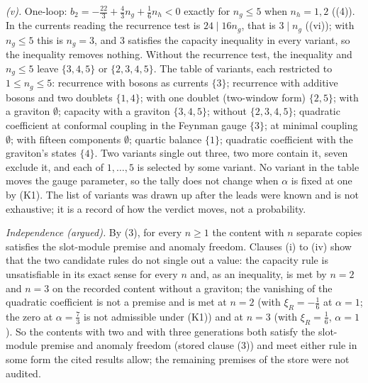 \emph{(v).} One-loop: $b_{2} = -\tfrac{22}{3} + \tfrac43 n_{g} + \tfrac16 n_{h} < 0$ exactly for $n_{g} \le 5$ when $n_{h} = 1, 2$ ((4)). In the currents reading the recurrence test is $24 \mid 16n_{g}$, that is $3 \mid n_{g}$ ((vi)); with $n_{g} \le 5$ this is $n_{g} = 3$, and $3$ satisfies the capacity inequality in every variant, so the inequality removes nothing. Without the recurrence test, the inequality and $n_{g} \le 5$ leave $\{3, 4, 5\}$ or $\{2, 3, 4, 5\}$. The table of variants, each restricted to $1 \le n_{g} \le 5$: recurrence with bosons as currents $\{3\}$; recurrence with additive bosons and two doublets $\{1, 4\}$; with one doublet (two-window form) $\{2, 5\}$; with a graviton $\emptyset$; capacity with a graviton $\{3, 4, 5\}$; without $\{2, 3, 4, 5\}$; quadratic coefficient at conformal coupling in the Feynman gauge $\{3\}$; at minimal coupling $\emptyset$; with fifteen components $\emptyset$; quartic balance $\{1\}$; quadratic coefficient with the graviton's states $\{4\}$. Two variants single out three, two more contain it, seven exclude it, and each of $1, \dots, 5$ is selected by some variant. No variant in the table moves the gauge parameter, so the tally does not change when $\alpha$ is fixed at one by (K1). The list of variants was drawn up after the leads were known and is not exhaustive; it is a record of how the verdict moves, not a probability.

\emph{Independence (argued).} By (3), for every $n \ge 1$ the content with $n$ separate copies satisfies the slot-module premise and anomaly freedom. Clauses (i) to (iv) show that the two candidate rules do not single out a value: the capacity rule is unsatisfiable in its exact sense for every $n$ and, as an inequality, is met by $n = 2$ and $n = 3$ on the recorded content without a graviton; the vanishing of the quadratic coefficient is not a premise and is met at $n = 2$ (with $\xi_{R} = -\tfrac16$ at $\alpha = 1$; the zero at $\alpha = \tfrac73$ is not admissible under (K1)) and at $n = 3$ (with $\xi_{R} = \tfrac16$, $\alpha = 1$). So the contents with two and with three generations both satisfy the slot-module premise and anomaly freedom (stored clause (3)) and meet either rule in some form the cited results allow; the remaining premises of the store were not audited.
